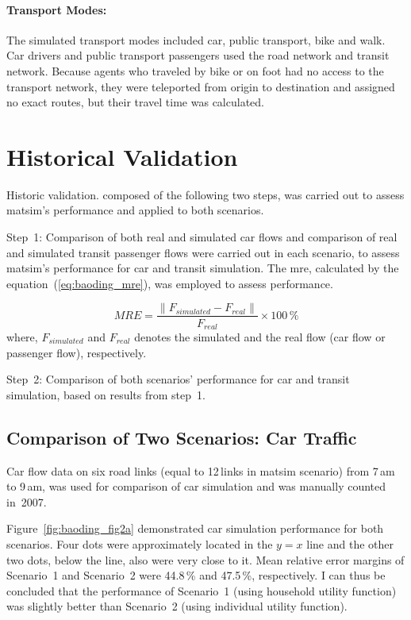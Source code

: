 \paragraph{Transport Modes:} The simulated transport modes included car, public transport, bike and walk. Car drivers and public transport passengers used the road network and transit network. Because agents who traveled by bike or on foot had no access to the transport network, they were teleported from origin to destination and assigned no exact routes, but their travel time was calculated. 

\section{Historical Validation}
Historic validation. composed of the following two steps, was carried out to assess \gls{matsim}'s performance and applied to both scenarios. 

Step~1: Comparison of both real and simulated car flows and comparison of real and simulated transit passenger flows were carried out in each scenario, to assess  \gls{matsim}'s performance for car and transit simulation. 
The \gls{mre},  calculated by the equation~(\ref{eq:baoding_mre}), was employed to assess performance.

\begin{equation}
\label{eq:baoding_mre}
MRE = \frac{\lVert F_{simulated} - F_{real} \lVert}{F_{real}} \times 100\,\%
\end{equation} 
where, $F_{simulated}$ and $F_{real}$ denotes the simulated and the real flow (car flow or passenger flow), respectively.

Step~2: Comparison of both scenarios' performance for car and transit simulation, based on results from step~1. 

\subsection{Comparison of Two Scenarios: Car Traffic}
Car flow data on six road links (equal to 12\,links in \gls{matsim} scenario) from 7\,am to 9\,am, was used for comparison of car simulation and was manually counted in~2007. 

Figure~\ref{fig:baoding_fig2a} demonstrated car simulation performance for both scenarios. 
Four dots were approximately located in the $y=x$ line and the other two dots, below the line, also were very close to it. 
Mean relative error margins of Scenario~1 and Scenario~2 were 44.8\,\% and 47.5\,\%, respectively. 
I can thus be concluded that the performance of Scenario~1 (using  household utility function) was slightly better than Scenario~2 (using individual utility function). 

